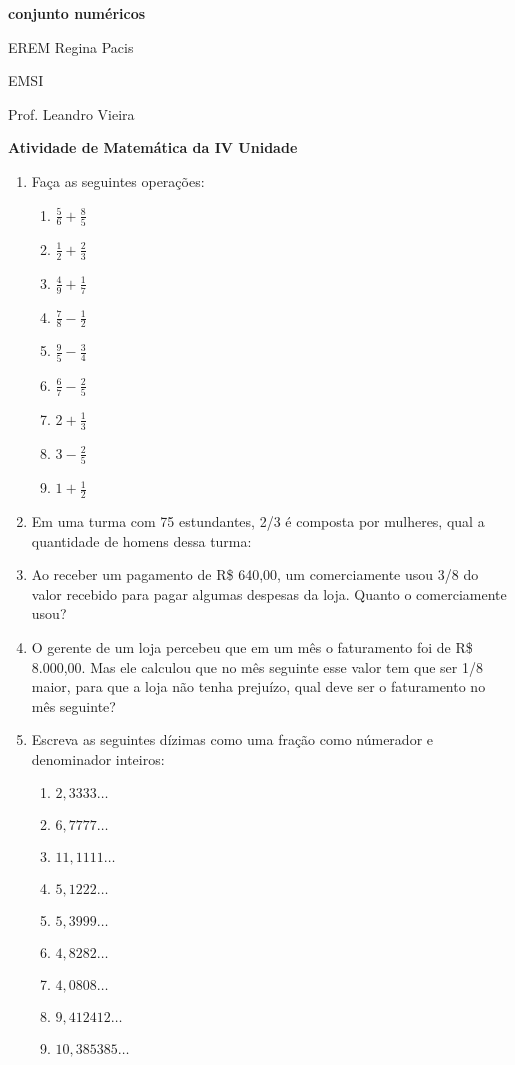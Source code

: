 \documentclass[twocolumn,oneside,a4paper,11pt]{article}
\newcommand{\EREM}{EREM Regina Pacis}
\newcommand{\curso}{EMSI}
\newcommand{\professor}{Prof. Leandro Vieira}
\newcommand{\m}[1]{\(\displaystyle #1\)}
\begin{document}
\pagestyle{empty}
\noindent \textbf{conjunto numéricos}

	\begin{center}
		\EREM
		\par %
		\curso
		\par
		\professor
		\par
		\vspace{10pt}
		\textbf{\large{Atividade de Matemática da IV Unidade}}
	\end{center}
	
\begin{enumerate}
\item Faça as seguintes operações:
\begin{multicols}{3}
	\begin{enumerate}
	\item \m{\frac{5}{6} + \frac{8}{5}}
	\item \m{\frac{1}{2} + \frac{2}{3}}
	\item \m{\frac{4}{9} + \frac{1}{7}}
	\item \m{\frac{7}{8} - \frac{1}{2}}
	\item \m{\frac{9}{5} - \frac{3}{4}}
	\item \m{\frac{6}{7} - \frac{2}{5}}
	\item \m{2 + \frac{1}{3}}
	\item \m{3 - \frac{2}{5}}
	\item \m{1 + \frac{1}{2}}
	\end{enumerate}
\end{multicols}

\item Em uma turma com 75 estundantes, 2/3 é composta por mulheres, qual a quantidade de homens dessa turma:

\item Ao receber um pagamento de R\$ 640,00, um comerciamente usou 3/8 do valor recebido para pagar algumas despesas da loja. Quanto o comerciamente usou?

\item O gerente de um loja percebeu que em um mês o faturamento foi de R\$ 8.000,00. Mas ele calculou que no mês seguinte esse valor tem que ser 1/8 maior, para que a loja não tenha prejuízo, qual deve ser o faturamento no mês seguinte? 

\item Escreva as seguintes dízimas como uma fração como númerador e denominador inteiros:
\begin{multicols}{2}
	\begin{enumerate}
	\item \m{2,3333 \ldots}
	\item \m{6,7777 \ldots}
	\item \m{11,1111 \ldots} 
	\item \m{5,1222 \ldots}
	\item \m{5,3999 \ldots} 
	\item \m{4,8282 \ldots}
	\item \m{4,0808 \ldots} 
	\item \m{9,412412 \ldots}
	\item \m{10,385385 \ldots} 
	\end{enumerate}
\end{multicols}


\end{enumerate}
\end{document}
